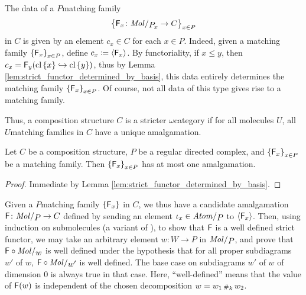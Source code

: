\begin{rmk}\label{rmk:data_matching family}
    The data of a \( P \)\nbd matching family 
    \begin{equation*}
        \set{\F_x \colon \molecin{\imel{P}{x}} \to C}_{x \in P}
    \end{equation*}
    in \( C \) is given by an element \( c_x \in C \) for each \( x \in P \).
    Indeed, given a matching family \( \left\{ {\mathsf{F}_x} \right\}_{x \in P} \), define \( c_x \coloneqq \langle\mathsf{F}_x\rangle \).
    By functoriality, if \( x \le y \), then \( c_x = \mathsf{F}_y(\mathrm{cl}\left\{ {x} \right\} \hookrightarrow \mathrm{cl}\left\{ {y} \right\}) \), thus by Lemma \ref{lem:strict_functor_determined_by_basis}, this data entirely determines the matching family \( \left\{ {\mathsf{F}_x} \right\}_{x \in P} \).
    Of course, not all data of this type gives rise to a matching family. 
\end{rmk}

\begin{rmk}
    Thus, a composition structure \( C \) is a stricter \( \omega \)\nbd category if for all molecules \( U \), all \( U \)\nbd matching families in \( C \) have a unique amalgamation.
\end{rmk}

\begin{lem}\label{lem:at_most_one_lift}
    Let \( C \) be a composition structure, \( P \) be a regular directed complex, and \( \left\{ {\mathsf{F}_x} \right\}_{x \in P} \) be a matching family. 
    Then \( \left\{ {\mathsf{F}_x} \right\}_{x \in P} \) has at most one amalgamation.
\end{lem}
\begin{proof}
    Immediate by Lemma \ref{lem:strict_functor_determined_by_basis}.
\end{proof}

\begin{comm} \label{comm:well_defined_amalgamation}
    Given a \( P \)\nbd matching family \( \left\{ {\mathsf{F}_x} \right\} \) in \( C \), we thus have a candidate amalgamation \( \F \colon \molecin{P} \to C \) defined by sending an element \( \mapel{x} \in \atomin{P} \) to \( \langle\mathsf{F}_x\rangle \).
    Then, using induction on submolecules (a variant of \cite[Comment 4.1.7]{hadzihasanovic2024combinatorics}), to show that \( \mathsf{F} \) is a well defined strict functor, we may take an arbitrary element \( w \colon W \to P \) in \( \molecin{P} \), and prove that \( \F \after \molecin{w} \) is well defined under the hypothesis that for all proper subdiagrams \( w' \) of \( w \), \( \F \after \molecin{w'} \) is well defined. 
    The base case on subdiagrams \( w' \) of \( w \) of dimension \( 0 \) is always true in that case.
    Here, ``well-defined'' means that the value of \( \mathsf{F}(w) \) is independent of the chosen decomposition \( w = w_1 \,{\scriptstyle\#}_{k}\, w_2 \).
\end{comm}

